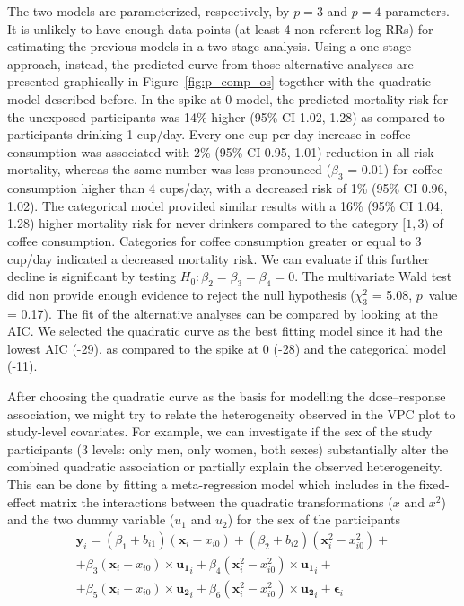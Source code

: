 \documentclass[11pt,a4paper,twoside,openany]{book}\usepackage{knitr}
\begin{document}
{\noindent The two models are parameterized, respectively, by $p = 3$ and $p = 4$ parameters. It is unlikely to have enough data points (at least 4 non referent log RRs) for estimating the previous models in a two-stage analysis. Using a one-stage approach, instead, the predicted curve from those alternative analyses are presented graphically in Figure~\ref{fig:p_comp_os} together with the quadratic model described before. 
In the spike at 0 model, the predicted mortality risk for the unexposed participants was 14\% higher (95\% CI 1.02, 1.28) as compared to participants drinking 1 cup/day. Every one cup per day increase in coffee consumption was associated with 2\% (95\% CI 0.95, 1.01) reduction in all-risk mortality, whereas the same number was less pronounced ($\beta_3$ = 0.01) for coffee consumption higher than 4 cups/day, with a decreased risk of 1\% (95\% CI 0.96, 1.02). 
The categorical model provided similar results with a 16\% (95\% CI 1.04, 1.28) higher mortality risk for never drinkers compared to the category $[1, 3)$ of coffee consumption. Categories for coffee consumption greater or equal to 3 cup/day indicated a decreased mortality risk. We can evaluate if this further decline is significant by testing $H_0: \beta_2 = \beta_3 = \beta_4 = 0$. The multivariate Wald test did non provide enough evidence to reject the null hypothesis ($\chi_3^2$ = 5.08, $p$~value = 0.17).
The fit of the alternative analyses can be compared by looking at the AIC. We selected the quadratic curve as the best fitting model since it had the lowest AIC (-29), as compared to the spike at 0 (-28) and the categorical model (-11).



After choosing the quadratic curve as the basis for modelling the dose--response association, we might try to relate the heterogeneity observed in the VPC plot to study-level covariates. For example, we can investigate if the sex of the study participants (3 levels: only men, only women, both sexes) substantially alter the combined quadratic association or partially explain the observed heterogeneity. This can be done by fitting a meta-regression model which includes in the fixed-effect matrix the interactions between the quadratic transformations ($x$ and $x^2$) and the two dummy variable ($u_1$ and $u_2$) for the sex of the participants
\begin{multline*}
\mathbf{y}_i = (\beta_1 + b_{i1}) (\mathbf{x}_{i} - {x}_{i0}) + (\beta_2  + b_{i2}) (\mathbf{x}_{i}^2 - {x}_{i0}^2) +  \\
+ \beta_3 (\mathbf{x}_{i} - {x}_{i0}) \times \mathbf{u_1}_{i} + \beta_4 (\mathbf{x}_{i}^2 - {x}_{i0}^2)\times \mathbf{u_1}_{i}  + \\ 
 + \beta_5 (\mathbf{x}_{i} - {x}_{i0}) \times \mathbf{u_2}_{i} + \beta_6 (\mathbf{x}_{i}^2 - {x}_{i0}^2)\times \mathbf{u_2}_{i}  + 
\boldsymbol{\epsilon}_{i}
\end{multline*}

}
\end{document}
